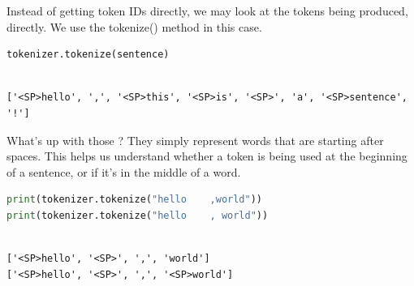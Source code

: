 \documentclass[../labs.tex]{subfiles}
\begin{document}
\noindent Instead of getting token IDs directly, we may look at the tokens being produced, directly. We use the tokenize() method in this case.

\begin{lstlisting}[language=Python,basicstyle=\ttfamily\scriptsize,breaklines=true,breakatwhitespace=false,columns=fullflexible,keepspaces=true,numbers=none]
tokenizer.tokenize(sentence)
\end{lstlisting}

\hypertarget{res:lab02-text-01-t5-ipynb-21-00379626e332}{}

\begin{lstlisting}[basicstyle=\ttfamily\scriptsize,breaklines=true,breakatwhitespace=false,columns=fullflexible,keepspaces=true]

['<SP>hello', ',', '<SP>this', '<SP>is', '<SP>', 'a', '<SP>sentence', '!']

\end{lstlisting}



\noindent What's up with those ? They simply represent words that are starting after spaces. This helps us understand whether a token is being used at the beginning of a sentence, or if it's in the middle of a word.

\begin{lstlisting}[language=Python,basicstyle=\ttfamily\scriptsize,breaklines=true,breakatwhitespace=false,columns=fullflexible,keepspaces=true,numbers=none]
print(tokenizer.tokenize("hello    ,world"))
print(tokenizer.tokenize("hello    , world"))
\end{lstlisting}

\hypertarget{res:lab02-text-01-t5-ipynb-23-c539047211c5}{}

\begin{lstlisting}[basicstyle=\ttfamily\scriptsize,breaklines=true,breakatwhitespace=false,columns=fullflexible,keepspaces=true]

['<SP>hello', '<SP>', ',', 'world']
['<SP>hello', '<SP>', ',', '<SP>world']

\end{lstlisting}

\end{document}
